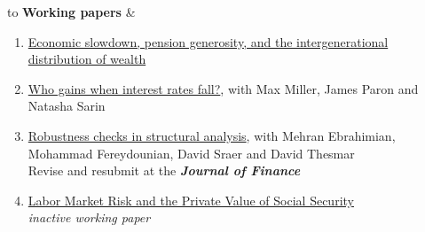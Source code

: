 \documentclass[6pt,letterpaper]{article}
\begin{document}
\begin{table}[H]
	\begin{tabu} to \textwidth {X[l]c}
		{\large \textbf{Working papers}}      &                                                                                                                                                                                                                                                                                                                                                                                                                                                                                                                                                                                                                                                                                                                                                                                                                                                                                                                                                                                                                                                                                                                                                                                                         \\ \hline
	\end{tabu}
\end{table}
\begin{enumerate} 
	\item \href{https://sylcath.github.io/sylvaincatherine.net/files/Pensions_v3.pdf}{Economic slowdown, pension generosity, and the intergenerational distribution of wealth} \vspace{.1cm}
	\item \href{https://sylcath.github.io/sylvaincatherine.net/files/CMPS.pdf}{Who gains when interest rates fall?}, with Max Miller, James Paron and Natasha Sarin \vspace{.1cm}
	\item \href{https://sylcath.github.io/sylvaincatherine.net/files/CEFST.pdf}{Robustness checks in structural analysis}, with Mehran Ebrahimian, Mohammad Fereydounian, David Sraer and David Thesmar\vspace{.1cm} \\
	{\small  Revise and resubmit at the \textit{\textbf{Journal of Finance}} } \vspace{.1cm} 
	\item \href{https://papers.ssrn.com/sol3/papers.cfm?abstract_id=2564431}{Labor Market Risk and the Private Value of Social Security}  \vspace{0.1cm} \\
	{\small  \textit{inactive working paper} } \vspace{.1cm} 
\end{enumerate}
\end{document}
